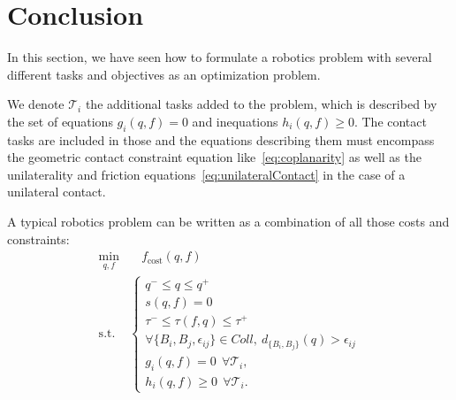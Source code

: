 \section{Conclusion}
\label{sec:Ch1_Conclusion}


In this section, we have seen how to formulate a robotics problem with several different tasks and objectives as an optimization problem.

We denote $\mathcal{T}_i$ the additional tasks added to the problem, which is described by the set of equations $g_i(q,f) = 0$ and inequations $h_i(q,f) \geq 0$.
The contact tasks are included in those and the equations describing them must encompass the geometric contact constraint equation like~\ref{eq:coplanarity} as well as the unilaterality and friction equations~\ref{eq:unilateralContact} in the case of a unilateral contact.

A typical robotics problem can be written as a combination of all those costs and constraints:
\begin{align}
\min_{q, f} & \quad f_\text{cost}(q,f) \nonumber\\
\text{s.t.}&
\left\{
\begin{array}{lr}
q^- \le q \le q^+\\
s(q,f) = 0 \\
\tau^- \le \tau(f,q) \le \tau^+\\
\forall \{B_i, B_j, \epsilon_{ij}\} \in Coll,\ d_{\{B_i, B_j\}}(q) > \epsilon_{ij}\\
g_i(q,f) = 0\ \ \forall\mathcal{T}_i,\\
h_i(q,f) \geq 0\ \ \forall\mathcal{T}_i.
\end{array}\right.
\label{eq:PG}
\end{align}




